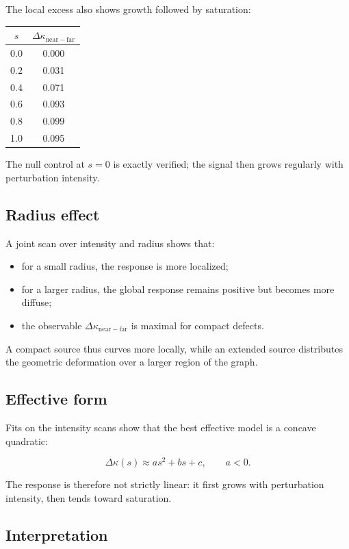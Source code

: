 \documentclass[11pt]{article}
\begin{document}
The local excess also shows growth followed by saturation:

\begin{center}
\begin{tabular}{cc}
\toprule
$s$ & $\Delta \kappa_{\mathrm{near-far}}$ \\
\midrule
0.0 & 0.000 \\
0.2 & 0.031 \\
0.4 & 0.071 \\
0.6 & 0.093 \\
0.8 & 0.099 \\
1.0 & 0.095 \\
\bottomrule
\end{tabular}
\end{center}

The null control at $s=0$ is exactly verified; the signal then grows
regularly with perturbation intensity.

\subsection{Radius effect}

A joint scan over intensity and radius shows that:

\begin{itemize}
\item for a small radius, the response is more localized;
\item for a larger radius, the global response remains positive
      but becomes more diffuse;
\item the observable $\Delta \kappa_{\mathrm{near-far}}$ is maximal
      for compact defects.
\end{itemize}

A compact source thus curves more locally, while an extended source
distributes the geometric deformation over a larger region of the graph.

\subsection{Effective form}

Fits on the intensity scans show that the best effective model is
a concave quadratic:

\[
\Delta \kappa(s)\approx as^2+bs+c,
\qquad a<0.
\]

The response is therefore not strictly linear: it first grows with
perturbation intensity, then tends toward saturation.

\subsection{Interpretation}
\end{document}
